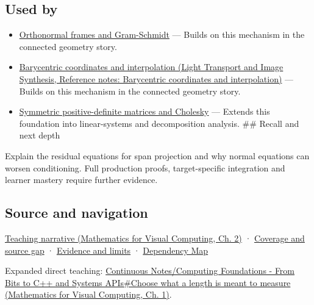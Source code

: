 \subsection{Used by}\label{appendix-3b863809f82a-used-by}

\begin{itemize}
\tightlist
\item
  \hyperref[appendix-c39f1ed34271]{Orthonormal frames and Gram-Schmidt} --- Builds on this mechanism in the connected geometry story.
\item
  \href{../04-Light-Transport-and-Image-Synthesis/main.pdf\#nameddest=appendix-02b9d9a81dca}{Barycentric coordinates and interpolation (Light Transport and Image Synthesis, Reference notes: Barycentric coordinates and interpolation)} --- Builds on this mechanism in the connected geometry story.
\item
  \hyperref[appendix-50d2ea3c9b26]{Symmetric positive-definite matrices and Cholesky} --- Extends this foundation into linear-systems and decomposition analysis. \#\# Recall and next depth
\end{itemize}

Explain the residual equations for span projection and why normal equations can worsen conditioning. Full production proofs, target-specific integration and learner mastery require further evidence.

\subsection{Source and navigation}\label{appendix-3b863809f82a-source-and-navigation}

\href{../02-Mathematics-for-Visual-Computing/main.pdf\#nameddest=01-foundations-i-ch018-a-gram-matrix-remembers-the-geometry-of-a-slanted-basis}{Teaching narrative (Mathematics for Visual Computing, Ch. 2)} · \hyperref[appendix-fd090d982a15-phase-6---parts-501-600]{Coverage and source gap} · \hyperref[appendix-a103e7846d21-phase-6---source-analysis-and-verification]{Evidence and limits} · \hyperref[appendix-4ad47bdd269a]{Dependency Map}

Expanded direct teaching: \href{../02-Mathematics-for-Visual-Computing/main.pdf\#nameddest=01-foundations-i-ch017-choose-what-a-length-is-meant-to-measure}{Continuous Notes/Computing Foundations - From Bits to C++ and Systems APIs\#Choose what a length is meant to measure (Mathematics for Visual Computing, Ch. 1)}.
